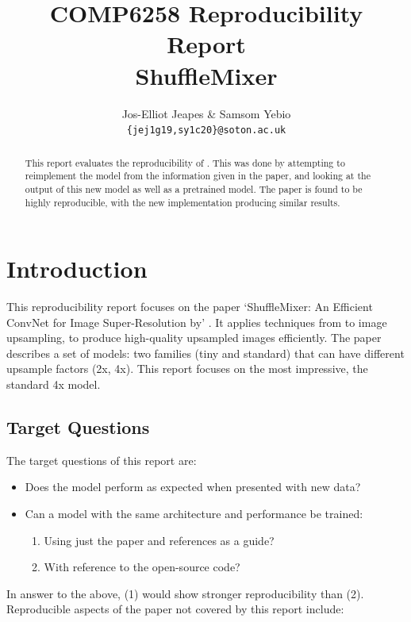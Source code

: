 \documentclass{article}
\title{COMP6258 Reproducibility Report \\ ShuffleMixer}
\author{Jos-Elliot Jeapes \& Samsom Yebio \\
\texttt{\{jej1g19,sy1c20\}@soton.ac.uk} \\
}
\begin{document}
    \maketitle

    \begin{abstract}
    This report evaluates the reproducibility of \citet{sun2022shufflemixer}. This was done by attempting to reimplement the model from the information given in the paper, and looking at the output of this new model as well as a pretrained model. The paper is found to be highly reproducible, with the new implementation producing similar results.
    \end{abstract}

    \section{Introduction}

    This reproducibility report focuses on the paper `ShuffleMixer: An Efficient ConvNet for Image
    Super-Resolution by' \citet{sun2022shufflemixer}. It applies techniques from \citet{ma2018shufflenet} to image upsampling, to produce high-quality upsampled images efficiently. The paper describes a set of models: two families (tiny and standard) that can have different upsample factors (2x, 4x). This report focuses on the most impressive, the standard 4x model.

    \subsection{Target Questions} \label{sec:target questions}

    The target questions of this report are:

    \begin{itemize}
        \item Does the model perform as expected when presented with new data?
        \item Can a model with the same architecture and performance be trained:
        \begin{enumerate}
            \item Using just the paper and references as a guide?
            \item With reference to the open-source code?
        \end{enumerate}
    \end{itemize}

    In answer to the above, (1) would show stronger reproducibility than (2). Reproducible aspects of the paper not covered by this report include:
\end{document}

